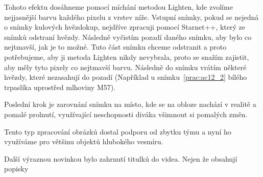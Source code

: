 \documentclass[12pt,a4paper,titlepage]{article}
\begin{document}
Tohoto efektu dosáhneme pomocí míchání metodou Lighten, kde zvolíme nejjasnější barvu každého pixelu z vrstev níže. Vstupní snímky, pokud se nejedná o snímky kulových hvězdokup, nejdříve zpracuji pomocí Starnet++, který ze snímků odstraní hvězdy. Následně vyčistím pozadí daného snímku, aby bylo co nejtmavší, jak je to možné. Tuto část snímku chceme odstranit a proto potřebujeme, aby ji metoda Lighten nikdy nevybrala, proto se snažím zajistit, aby měly tyto pixely co nejtmavší barvu. Následně do snímku vrátím některé hvězdy, které nezasahují do pozadí (Například u snímku~\ref{prac:ac12_2} bílého trpaslíka uprostřed mlhoviny M57).

Poslední krok je zarovnání snímku na místo, kde se na obloze nachází v realitě a pomalé prolnutí, využívající neschopnosti diváka všimnout si pomalých změn.

Tento typ zpracování obrázků dostal podporu od zbytku týmu a nyní ho využíváme pro většinu objektů hlubokého vesmíru.

Další výraznou novinkou bylo zahrnutí titulků do videa. Nejen že obsahují popisky
\end{document}
